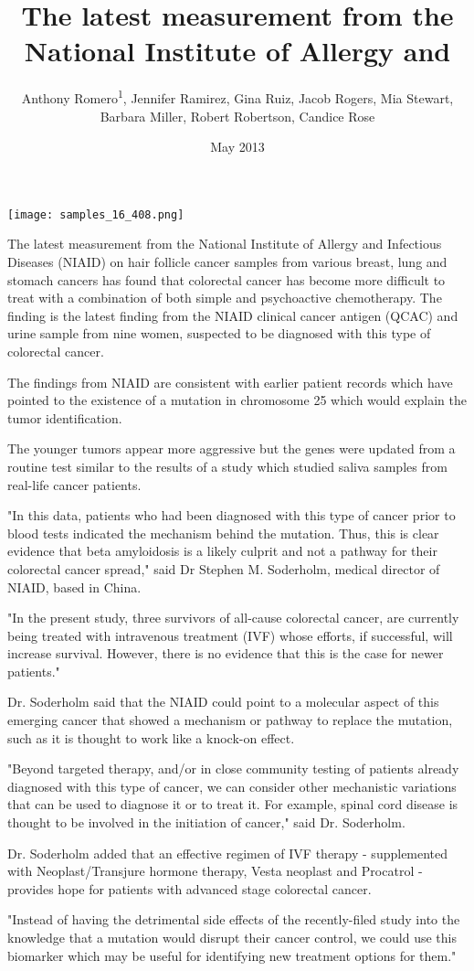 \documentclass{article}
\title{The latest measurement from the National Institute of Allergy and}
\author{Anthony Romero\textsuperscript{1},  Jennifer Ramirez,  Gina Ruiz,  Jacob Rogers,  Mia Stewart,  Barbara Miller,  Robert Robertson,  Candice Rose}
\affil{\textsuperscript{1}Wuhan University}
\date{May 2013}
\begin{document}
\maketitle

\begin{center}
\begin{minipage}{0.75\linewidth}
\texttt{[image: samples\_16\_408.png]}
\end{minipage}
\end{center}

The latest measurement from the National Institute of Allergy and Infectious Diseases (NIAID) on hair follicle cancer samples from various breast, lung and stomach cancers has found that colorectal cancer has become more difficult to treat with a combination of both simple and psychoactive chemotherapy. The finding is the latest finding from the NIAID clinical cancer antigen (QCAC) and urine sample from nine women, suspected to be diagnosed with this type of colorectal cancer.

The findings from NIAID are consistent with earlier patient records which have pointed to the existence of a mutation in chromosome 25 which would explain the tumor identification.

The younger tumors appear more aggressive but the genes were updated from a routine test similar to the results of a study which studied saliva samples from real-life cancer patients.

"In this data, patients who had been diagnosed with this type of cancer prior to blood tests indicated the mechanism behind the mutation. Thus, this is clear evidence that beta amyloidosis is a likely culprit and not a pathway for their colorectal cancer spread," said Dr Stephen M. Soderholm, medical director of NIAID, based in China.

"In the present study, three survivors of all-cause colorectal cancer, are currently being treated with intravenous treatment (IVF) whose efforts, if successful, will increase survival. However, there is no evidence that this is the case for newer patients."

Dr. Soderholm said that the NIAID could point to a molecular aspect of this emerging cancer that showed a mechanism or pathway to replace the mutation, such as it is thought to work like a knock-on effect.

"Beyond targeted therapy, and/or in close community testing of patients already diagnosed with this type of cancer, we can consider other mechanistic variations that can be used to diagnose it or to treat it. For example, spinal cord disease is thought to be involved in the initiation of cancer," said Dr. Soderholm.

Dr. Soderholm added that an effective regimen of IVF therapy - supplemented with Neoplast/Transjure hormone therapy, Vesta neoplast and Procatrol - provides hope for patients with advanced stage colorectal cancer.

"Instead of having the detrimental side effects of the recently-filed study into the knowledge that a mutation would disrupt their cancer control, we could use this biomarker which may be useful for identifying new treatment options for them."
\end{document}
